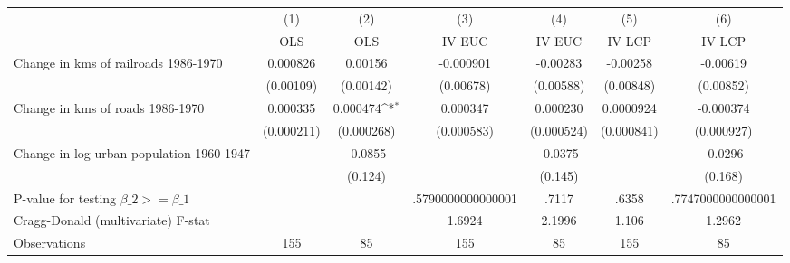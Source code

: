 {
\def\sym#1{\ifmmode^{#1}\else\(^{#1}\)\fi}
\begin{tabular}{l*{6}{c}}
\hline\hline
                &\multicolumn{1}{c}{(1)}&\multicolumn{1}{c}{(2)}&\multicolumn{1}{c}{(3)}&\multicolumn{1}{c}{(4)}&\multicolumn{1}{c}{(5)}&\multicolumn{1}{c}{(6)}\\
                &\multicolumn{1}{c}{OLS}&\multicolumn{1}{c}{OLS}&\multicolumn{1}{c}{IV EUC}&\multicolumn{1}{c}{IV EUC}&\multicolumn{1}{c}{IV LCP}&\multicolumn{1}{c}{IV LCP}\\
\hline
Change in kms of railroads 1986-1970& 0.000826         &  0.00156         &-0.000901         & -0.00283         & -0.00258         & -0.00619         \\
                &(0.00109)         &(0.00142)         &(0.00678)         &(0.00588)         &(0.00848)         &(0.00852)         \\
[1em]
Change in kms of roads 1986-1970& 0.000335         & 0.000474\sym{*}  & 0.000347         & 0.000230         &0.0000924         &-0.000374         \\
                &(0.000211)         &(0.000268)         &(0.000583)         &(0.000524)         &(0.000841)         &(0.000927)         \\
[1em]
Change in log urban population 1960-1947&                  &  -0.0855         &                  &  -0.0375         &                  &  -0.0296         \\
                &                  &  (0.124)         &                  &  (0.145)         &                  &  (0.168)         \\
\hline
P-value for testing $\beta\_{2} >= \beta\_{1}$&                  &                  &.5790000000000001         &    .7117         &    .6358         &.7747000000000001         \\
Cragg-Donald (multivariate) F-stat&                  &                  &   1.6924         &   2.1996         &    1.106         &   1.2962         \\
Observations    &      155         &       85         &      155         &       85         &      155         &       85         \\
\hline\hline
\end{tabular}
}
